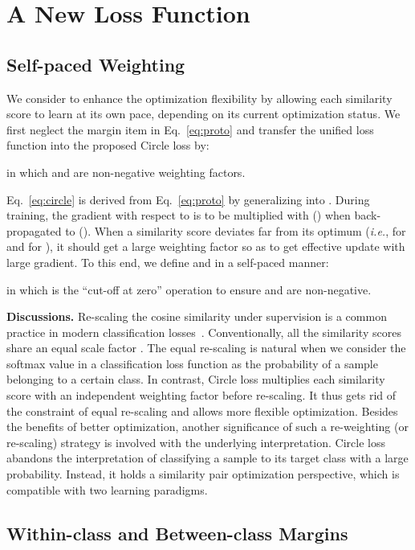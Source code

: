 \documentclass[10pt,twocolumn,letterpaper]{article}
\begin{document}
\section{A New Loss Function} \label{sec:circle_loss}
\subsection{Self-paced Weighting}
We consider to enhance the optimization flexibility by allowing each similarity score to learn at its own pace, depending on its current optimization status. We first neglect the margin item  in Eq.~\ref{eq:proto} and transfer the unified loss function into the proposed Circle loss by:
 
in which  and  are non-negative weighting factors.

Eq.~\ref{eq:circle} is derived from Eq.~\ref{eq:proto} by generalizing  into .
During training, the gradient with respect to  is to be multiplied with  () when back-propagated to  (). 
When a similarity score deviates far from its optimum (\emph{i.e.},  for  and  for ), it should get a large weighting factor so as to get effective update with large gradient.
To this end, we define  and  in a self-paced manner:


in which  is the ``cut-off at zero'' operation to ensure  and  are non-negative.

\textbf{Discussions.} Re-scaling the cosine similarity under supervision is a common practice in modern classification losses~\cite{ranjan2017l2,wang2017normface,wang2018additive,Wang_2018_CVPR,Zhang2018HeatedUpSE,Zhang2019AdaCosAS}. Conventionally, all the similarity scores share an equal scale factor . The equal re-scaling is natural when we consider the softmax value in a classification loss function as the probability of a sample belonging to a certain class. In contrast, Circle loss multiplies each similarity score with an independent weighting factor before re-scaling. It thus gets rid of the constraint of equal re-scaling and allows more flexible optimization. Besides the benefits of better optimization, another significance of such a re-weighting (or re-scaling) strategy is involved with the underlying interpretation. Circle loss abandons the interpretation of classifying a sample to its target class with a large probability. Instead, it holds a similarity pair optimization perspective, which is compatible with two learning paradigms.

\subsection{Within-class and Between-class Margins}\label{sec:method_margin}
\end{document}
